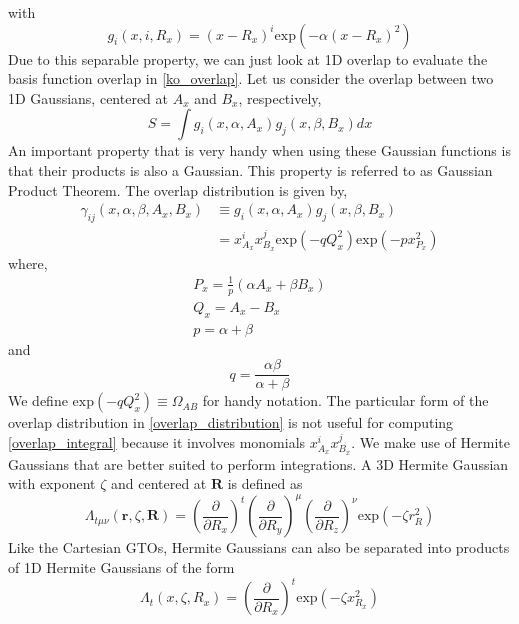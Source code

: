 with 
\begin{equation}
    g_i(x,i,R_x) = (x-R_x)^i\text{exp}(-\alpha (x-R_x)^2)
\end{equation}
Due to this separable property, we can just look at 1D overlap to evaluate the basis function overlap in \eqref{ko_overlap}. Let us consider the overlap between two 1D Gaussians, centered at $A_x$ and $B_x$, respectively,
\begin{equation}\label{overlap_integral}
    S = \int g_i(x,\alpha,A_x)g_j(x,\beta,B_x) dx
\end{equation}
An important property that is very handy when using these Gaussian functions is that their products is also a Gaussian. This property is referred to as Gaussian Product Theorem. The overlap distribution is given by,
\begin{align}\label{overlap_distribution}
    \gamma_{ij}(x,\alpha,\beta,A_x,B_x) &\equiv   g_i(x,\alpha,A_x)g_j(x,\beta,B_x) \nonumber \\
    &= x^i_{A_x}x^j_{B_x}\text{exp}(-qQ^2_x)\text{exp}(-px^2_{P_x})
\end{align}
where,
\begin{gather*}
    P_x = \frac{1}{p}\left(\alpha A_x+\beta B_x\right) \\
    Q_x = A_x - B_x \\
    p = \alpha + \beta
\end{gather*}
and 
\begin{equation*}
    q = \frac{\alpha\beta}{\alpha+\beta}
\end{equation*}
We define $\text{exp}(-qQ^2_x) \equiv \Omega_{AB}$ for handy notation. The particular form of the overlap distribution in \eqref{overlap_distribution} is not useful for computing \eqref{overlap_integral} because it involves monomials $ x^i_{A_x}x^j_{B_x}$. We make use of Hermite Gaussians that are better suited to perform integrations. A 3D Hermite Gaussian with exponent $\zeta$ and centered at $\mathbf{R}$ is defined as 
\begin{equation}\label{hermite_gaussian}
    \Lambda_{t\mu\nu}(\mathbf{r},\zeta,\mathbf{R}) = \left(\frac{\partial}{\partial R_x}\right)^t\left(\frac{\partial}{\partial R_y}\right)^\mu\left(\frac{\partial}{\partial R_z}\right)^\nu
    \text{exp}(-\zeta r_R^2)
\end{equation}
Like the Cartesian GTOs, Hermite Gaussians can also be separated into products of 1D Hermite Gaussians of the form
\begin{equation}
    \Lambda_t(x,\zeta,R_x) = \left(\frac{\partial}{\partial R_x}\right)^t \text{exp}(-\zeta x_{R_x}^2)
\end{equation}
